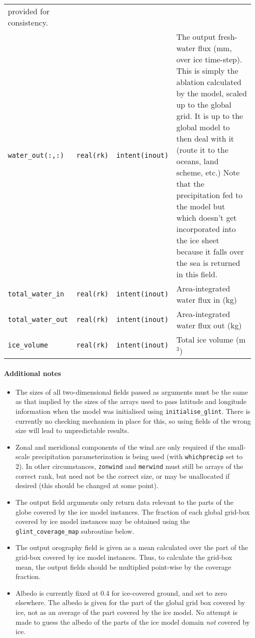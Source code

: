 \begin{center}
\begin{supertabular*}{\textwidth}{@{\extracolsep{\fill}}lllp{5.5cm}}
    provided for consistency.\\
    \texttt{water\_out(:,:)} & \texttt{real(rk)} & \texttt{intent(inout)} & The
    output fresh-water flux (mm, over ice time-step). This is simply the ablation calculated by
    the model, scaled up to the global grid. It is up to the global model to
    then  deal with it (route it to the oceans, land scheme, etc.) Note that
    the precipitation fed to the model but which doesn't get incorporated into
    the ice sheet because it falls over the sea is returned in this field. \\ 
    \texttt{total\_water\_in} & \texttt{real(rk)} & \texttt{intent(inout)} &
    Area-integrated water flux in (kg)\\ 
    \texttt{total\_water\_out} & \texttt{real(rk)} & \texttt{intent(inout)} &
    Area-integrated water flux out (kg)\\
    \texttt{ice\_volume} & \texttt{real(rk)} & \texttt{intent(inout)} & Total ice volume (m$^3$)\\
  \end{supertabular*}
\end{center}
\paragraph{Additional notes}
%
\begin{itemize}
\item The sizes of all two-dimensional fields passed as arguments must be the
  same as that implied by the sizes of the arrays used to pass latitude and
  longitude information when the model was initialised using
  \texttt{initialise\_glint}. There is
  currently no checking mechanism in place for this, so using fields of the wrong size
  will lead to unpredictable results.
\item Zonal and meridional components of the wind are only required if the
  small-scale precipitation parameterization is being used (with
  \texttt{whichprecip} set to 2). In other circumstances, \texttt{zonwind} and
  \texttt{merwind} must still be arrays of the correct rank, but need not be
  the correct size, or may be unallocated if desired (this should be changed
  at some point).
\item The output field arguments only return data relevant to the parts of the globe
  covered by the ice model instances. The fraction of each global
  grid-box covered by ice model instances may be obtained using the
  \texttt{glint\_coverage\_map} subroutine below. 
\item The output orography field is given as a mean calculated over the part
  of the grid-box covered by ice  model instances. Thus, to calculate the
  grid-box mean, the output fields should be multiplied point-wise by the
  coverage fraction. 
\item Albedo is currently fixed at 0.4 for ice-covered ground, and set to zero
  elsewhere. The albedo is given for the part of the global grid box covered
  by ice, not as an average of the part covered by the ice model. No attempt
  is made to guess the albedo of the parts of the ice model domain \emph{not}
  covered by ice.
\end{itemize}
%
